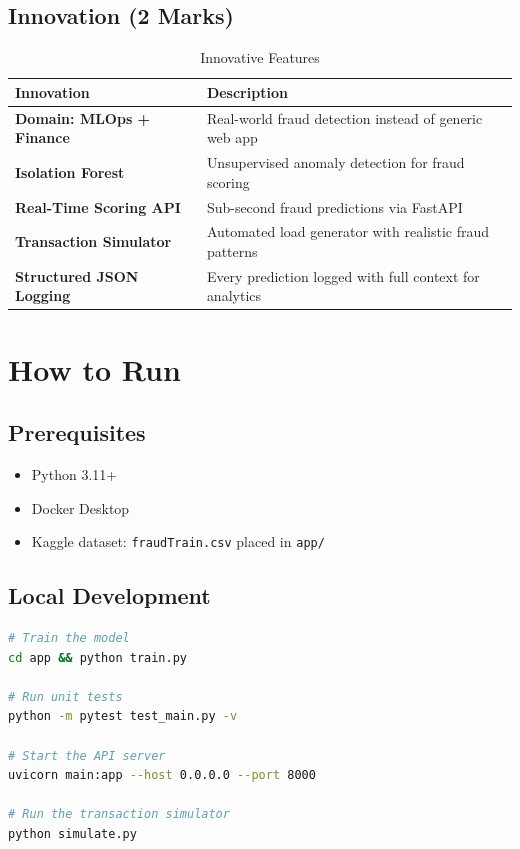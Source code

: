 \documentclass[12pt,a4paper]{article}
\begin{document}
\subsection{Innovation (2 Marks)}

\begin{table}[H]
\centering
\caption{Innovative Features}
\begin{tabular}{@{}lp{9cm}@{}}
\toprule
\textbf{Innovation} & \textbf{Description} \\
\midrule
\textbf{Domain: MLOps + Finance} & Real-world fraud detection instead of generic web app \\
\textbf{Isolation Forest} & Unsupervised anomaly detection for fraud scoring \\
\textbf{Real-Time Scoring API} & Sub-second fraud predictions via FastAPI \\
\textbf{Transaction Simulator} & Automated load generator with realistic fraud patterns \\
\textbf{Structured JSON Logging} & Every prediction logged with full context for analytics \\
\bottomrule
\end{tabular}
\end{table}

\section{How to Run}

\subsection{Prerequisites}

\begin{itemize}
    \item Python 3.11+
    \item Docker Desktop
    \item Kaggle dataset: \texttt{fraudTrain.csv} placed in \texttt{app/}
\end{itemize}

\subsection{Local Development}

\begin{lstlisting}[language=bash,caption={Local Setup Commands}]
# Train the model
cd app && python train.py

# Run unit tests
python -m pytest test_main.py -v

# Start the API server
uvicorn main:app --host 0.0.0.0 --port 8000

# Run the transaction simulator
python simulate.py
\end{lstlisting}
\end{document}
